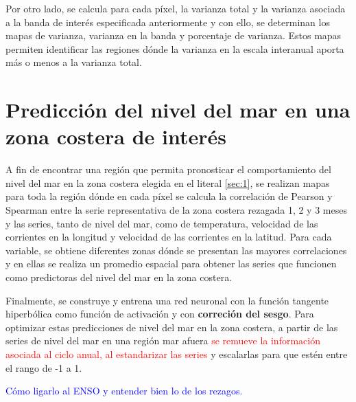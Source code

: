 Por otro lado, se calcula para cada píxel, la varianza total y la varianza asociada a la banda de interés especificada anteriormente y con ello, se determinan los mapas de varianza, varianza en la banda y porcentaje de varianza. Estos mapas permiten identificar las regiones dónde la varianza en la escala interanual aporta más o menos a la varianza total.

\section{Predicción del nivel del mar en una zona costera de interés}

A fin de encontrar una región que permita pronosticar el comportamiento del nivel del mar en la zona costera elegida en el literal \ref{sec:1}, se realizan mapas para toda la región dónde en cada píxel se calcula la correlación de Pearson y Spearman entre la serie representativa de la zona costera rezagada 1, 2 y 3 meses y las series, tanto de nivel del mar, como de temperatura, velocidad de las corrientes en la longitud y velocidad de las corrientes en la latitud. Para cada variable, se obtiene diferentes zonas dónde se presentan las mayores correlaciones y en ellas se realiza un promedio espacial para obtener las series que funcionen como predictoras del nivel del mar en la zona costera.

Finalmente, se construye y entrena una red neuronal con la función tangente hiperbólica como función de activación y con \textbf{correción del sesgo}. Para optimizar estas predicciones de nivel del mar en la zona costera, a partir de las series de nivel del mar en una región mar afuera \textcolor{red}{se remueve la información asociada al ciclo anual, al estandarizar las series } y escalarlas para que estén entre el rango de -1 a 1.

\textcolor{blue}{Cómo ligarlo al ENSO y entender bien lo de los rezagos.}
